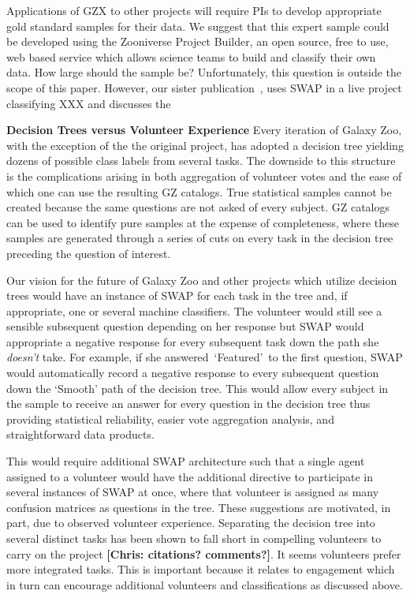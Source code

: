 \documentclass[twocolumn]{aastex6}
\newcommand{\feat}{`Featured'}
\begin{document}
Applications of GZX to other projects will require PIs to develop appropriate 
gold standard samples for their data. We suggest that this expert sample could be
developed using the Zooniverse Project Builder, an open source, free to use, web based 
service which allows science teams to build and classify their own data.
 How large should the sample be?  Unfortunately, this question is outside the scope 
of this paper. However, our sister publication~\citep{Wright2016, submitted}, uses 
SWAP in a live project classifying XXX and discusses the 


\textbf{Decision Trees versus Volunteer Experience}
Every iteration of Galaxy Zoo, with the exception of the the original project, has 
adopted a decision tree yielding dozens of possible class labels from several tasks.
The downside to this structure is the complications arising in both aggregation of  
volunteer votes and the ease of which one can use the resulting GZ catalogs. True 
statistical samples cannot be created because the same questions are not asked 
of every subject. GZ catalogs can be used to identify pure samples at the expense
of completeness, where these samples are generated through a series of cuts on 
every task in the decision tree preceding the question of interest. 

Our vision for the future of Galaxy Zoo and other projects which utilize decision trees
would have an instance of SWAP for each task in the tree and, if appropriate, 
one or several machine classifiers.  The volunteer would still see a sensible subsequent
question depending on her response but SWAP would appropriate a negative response 
for every subsequent task down the path she \textit{doesn't} take. For example, 
if she answered~\feat~to the first question, SWAP would automatically record a 
negative response to every subsequent question down the `Smooth' path of the decision tree. 
This would allow every subject in the sample to receive an answer for every question
 in the decision tree thus providing statistical reliability, easier vote aggregation analysis, 
and straightforward data products.  

This would require additional SWAP architecture such that a single agent assigned
to a volunteer would have the additional directive to participate in several instances of SWAP
at once, where that volunteer is assigned as many confusion matrices as questions in the tree.
These suggestions are motivated, in part, due to observed volunteer experience. 
 Separating the decision tree into several distinct tasks has been shown to fall short 
in compelling volunteers to carry on the project \textbf{[Chris: citations? comments?]}. 
It seems volunteers prefer more integrated tasks. This is 
important because it relates to engagement which in turn can encourage additional
volunteers and classifications as discussed above. 
\end{document}
